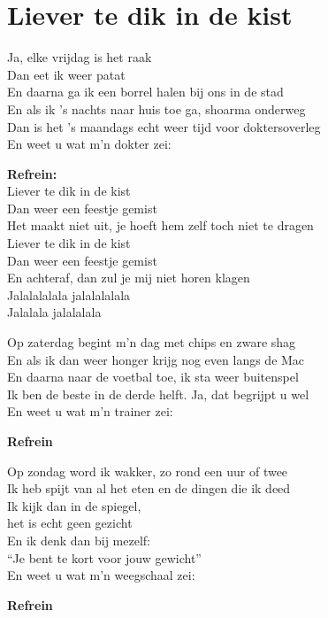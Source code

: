 \section{Liever te dik in de kist}
Ja, elke vrijdag is het raak\\
Dan eet ik weer patat\\
En daarna ga ik een borrel halen bij ons in
de stad\\
En als ik ’s nachts naar huis toe ga, shoarma
onderweg\\
Dan is het ’s maandags echt weer tijd voor
doktersoverleg\\
En weet u wat m’n dokter zei:

\textbf{Refrein:}\\
Liever te dik in de kist\\
Dan weer een feestje gemist\\
Het maakt niet uit, je hoeft hem zelf toch
niet te dragen\\
Liever te dik in de kist\\
Dan weer een feestje gemist\\
En achteraf, dan zul je mij niet horen klagen\\
Jalalalalala jalalalalala\\
Jalalala jalalalala

Op zaterdag begint m’n dag met chips en
zware shag\\
En als ik dan weer honger krijg nog even
langs de Mac\\
En daarna naar de voetbal toe, ik sta weer
buitenspel\\
Ik ben de beste in de derde helft. Ja, dat
begrijpt u wel\\
En weet u wat m’n trainer zei:

\textbf{Refrein}

Op zondag word ik wakker, zo rond een uur
of twee\\
Ik heb spijt van al het eten en de dingen die
ik deed\\
Ik kijk dan in de spiegel,\\
het is echt geen gezicht\\
En ik denk dan bij mezelf:\\
“Je bent te kort voor jouw gewicht”\\
En weet u wat m’n weegschaal zei:

\textbf{Refrein}